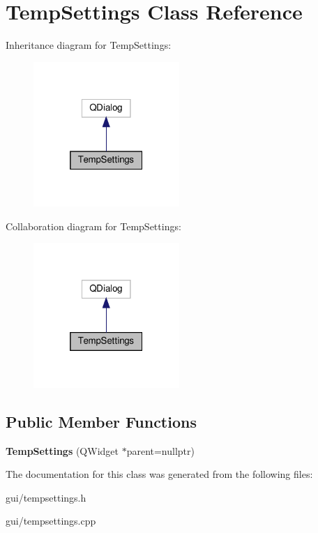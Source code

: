 \hypertarget{classTempSettings}{}\section{Temp\+Settings Class Reference}
\label{classTempSettings}


Inheritance diagram for Temp\+Settings\+:\nopagebreak
\begin{figure}[H]
\begin{center}
\leavevmode
\includegraphics[width=157pt]{classTempSettings__inherit__graph}
\end{center}
\end{figure}


Collaboration diagram for Temp\+Settings\+:\nopagebreak
\begin{figure}[H]
\begin{center}
\leavevmode
\includegraphics[width=157pt]{classTempSettings__coll__graph}
\end{center}
\end{figure}
\subsection*{Public Member Functions}
\begin{DoxyCompactItemize}
\item 
\mbox{\label{classTempSettings_aa50367593402402eb7922ec4f4d1564a}} 
{\bfseries Temp\+Settings} (Q\+Widget $\ast$parent=nullptr)
\end{DoxyCompactItemize}


The documentation for this class was generated from the following files\+:\begin{DoxyCompactItemize}
\item 
gui/tempsettings.\+h\item 
gui/tempsettings.\+cpp\end{DoxyCompactItemize}
